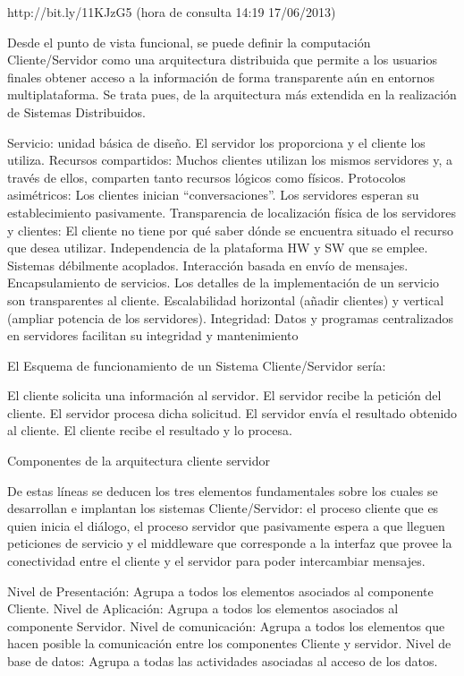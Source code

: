 http://bit.ly/11KJzG5 (hora de consulta 14:19 17/06/2013)

Desde el punto de vista funcional, se puede definir la computación Cliente/Servidor como una arquitectura distribuida que permite 
a los usuarios finales obtener acceso a la información de forma transparente aún en entornos multiplataforma. Se trata pues, 
de la arquitectura más extendida en la realización de Sistemas Distribuidos.

Servicio: unidad básica de diseño. El servidor los proporciona y el cliente los utiliza.
Recursos compartidos: Muchos clientes utilizan los mismos servidores y, a través de ellos, comparten tanto recursos lógicos como físicos.
Protocolos asimétricos: Los clientes inician “conversaciones”. Los servidores esperan su establecimiento pasivamente.
Transparencia de localización física de los servidores y clientes: El cliente no tiene por qué saber dónde se encuentra situado el 
recurso que desea utilizar.
Independencia de la plataforma HW y SW que se emplee.
Sistemas débilmente acoplados. Interacción basada en envío de mensajes.
Encapsulamiento de servicios. Los detalles de la implementación de un servicio son transparentes al cliente.
Escalabilidad horizontal (añadir clientes) y vertical (ampliar potencia de los servidores).
Integridad: Datos y programas centralizados en servidores facilitan su integridad y mantenimiento

El Esquema de funcionamiento de un Sistema Cliente/Servidor sería:

    El cliente solicita una información al servidor.
    El servidor recibe la petición del cliente.
    El servidor procesa dicha solicitud.
    El servidor envía el resultado obtenido al cliente.
    El cliente recibe el resultado y lo procesa.


    
Componentes de la arquitectura cliente servidor

De estas líneas se deducen los tres elementos fundamentales sobre los cuales se desarrollan e implantan los sistemas 
Cliente/Servidor: el proceso cliente que es quien inicia el diálogo, el proceso servidor que pasivamente espera a que lleguen 
peticiones de servicio y el middleware que corresponde a la interfaz que provee la conectividad entre el cliente y el servidor 
para poder intercambiar mensajes.
    
Nivel de Presentación: Agrupa a todos los elementos asociados al componente Cliente.
Nivel de Aplicación: Agrupa a todos los elementos asociados al componente Servidor.
Nivel de comunicación: Agrupa a todos los elementos que hacen posible la comunicación entre los componentes Cliente y servidor.
Nivel de base de datos: Agrupa a todas las actividades asociadas al acceso de los datos.


